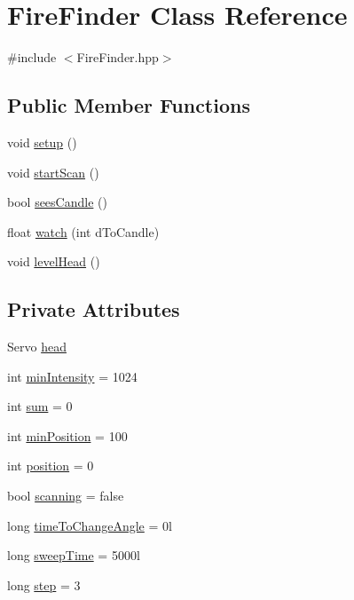 \hypertarget{classFireFinder}{\section{Fire\-Finder Class Reference}
\label{classFireFinder}
}


{\ttfamily \#include $<$Fire\-Finder.\-hpp$>$}

\subsection*{Public Member Functions}
\begin{DoxyCompactItemize}
\item 
void \hyperlink{classFireFinder_aaa2beb5a87e2d9dbd83c0dee1f4f1ef0}{setup} ()
\item 
void \hyperlink{classFireFinder_ab2cddefdf1200e176231a601a3a1ede3}{start\-Scan} ()
\item 
bool \hyperlink{classFireFinder_afa2879ee6ace8a6b5e298c4186df6178}{sees\-Candle} ()
\item 
float \hyperlink{classFireFinder_afbdb8a5938750d5091becec74fc1f907}{watch} (int d\-To\-Candle)
\item 
void \hyperlink{classFireFinder_ad0ce95ec7a5858be9b80a3c103120008}{level\-Head} ()
\end{DoxyCompactItemize}
\subsection*{Private Attributes}
\begin{DoxyCompactItemize}
\item 
Servo \hyperlink{classFireFinder_ac6a7b4e986e63cddb3f010e8909c00f8}{head}
\item 
int \hyperlink{classFireFinder_a7d3912a911843b60de3468588cfe8579}{min\-Intensity} = 1024
\item 
int \hyperlink{classFireFinder_a84926ae7c01b8c03bb87c810136a41ff}{sum} = 0
\item 
int \hyperlink{classFireFinder_ad8be0837d88f10d65b6f8a405f29494a}{min\-Position} = 100
\item 
int \hyperlink{classFireFinder_a40e204a2807939b3195024f14a9278fc}{position} = 0
\item 
bool \hyperlink{classFireFinder_aec1a3ae4b80847a907898601c64386cb}{scanning} = false
\item 
long \hyperlink{classFireFinder_a97b1a598ddb7886feb4a96a4931cc103}{time\-To\-Change\-Angle} = 0l
\item 
long \hyperlink{classFireFinder_aaa38192d82bc4120129b72fee61f72f1}{sweep\-Time} = 5000l
\item 
long \hyperlink{classFireFinder_ad482526cf32997919cbc31f61d12065d}{step} = 3
\end{DoxyCompactItemize}

